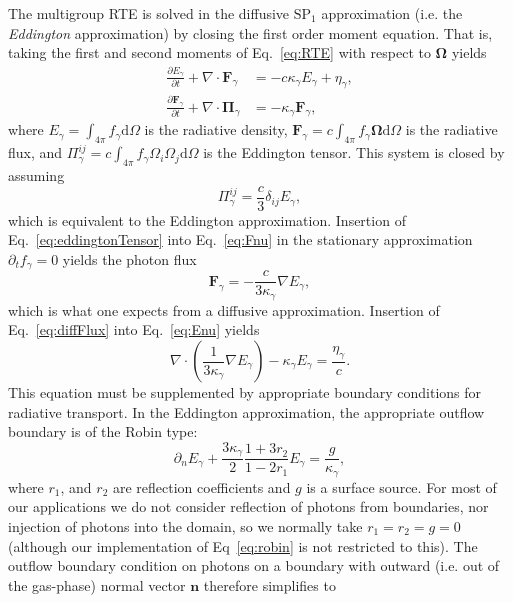 \documentclass[3p]{elsarticle}
\def\diff{\ensuremath{\text{d}}}
\begin{document}
The multigroup RTE is solved in the diffusive $\text{SP}_1$ approximation (i.e. the \emph{Eddington} approximation) by closing the first order moment equation. That is, taking the first and second moments of Eq.~\eqref{eq:RTE} with respect to $\bm{\Omega}$ yields
\begin{subequations}
  \begin{align}
    \label{eq:Enu}
    \frac{\partial E_\gamma}{\partial t} + \nabla\cdot\bm{F}_\gamma &= -c\kappa_\gamma E_\gamma + \eta_\gamma, \\
    \label{eq:Fnu}
    \frac{\partial \bm{F}_\gamma}{\partial t} + \nabla\cdot\bm{\Pi}_\gamma &= -\kappa_\gamma \bm{F}_\gamma,
  \end{align}
\end{subequations}
where $E_\gamma = \int_{4\pi}f_\gamma \diff\Omega$ is the radiative density, $\bm{F}_\gamma = c\int_{4\pi}f_\gamma\bm{\Omega} \diff\Omega$ is the radiative flux, and $\Pi_\gamma^{ij} = c\int_{4\pi}f_\gamma\Omega_i\Omega_j \diff\Omega$ is the Eddington tensor. This system is closed by assuming
\begin{equation}
  \label{eq:eddingtonTensor}
  \Pi_\gamma^{ij} = \frac{c}{3}\delta_{ij}E_\gamma,
\end{equation}
which is equivalent to the Eddington approximation. Insertion of Eq.~\eqref{eq:eddingtonTensor} into Eq.~\eqref{eq:Fnu} in the stationary approximation $\partial_tf_\gamma = 0$ yields the photon flux
\begin{equation}
  \label{eq:diffFlux}
  \bm{F}_\gamma = -\frac{c}{3\kappa_\gamma}\nabla E_\gamma,
\end{equation}
which is what one expects from a diffusive approximation. Insertion of Eq.~\eqref{eq:diffFlux} into Eq.~\eqref{eq:Enu} yields
\begin{equation}
  \label{eq:sp1}
  \nabla\cdot\left(\frac{1}{3\kappa_\gamma}\nabla E_\gamma\right) - \kappa_\gamma E_\gamma = \frac{\eta_\gamma}{c}. 
\end{equation}
This equation must be supplemented by appropriate boundary conditions for radiative transport. In the Eddington approximation, the appropriate outflow boundary is of the Robin type:
\begin{equation}
  \label{eq:robin}
  \partial_nE_\gamma + \frac{3\kappa_\gamma}{2}\frac{1 + 3r_2}{1 - 2r_1}E_\gamma = \frac{g}{\kappa_\gamma},
\end{equation}
where $r_1$, and $r_2$ are reflection coefficients and $g$ is a surface source. For most of our applications we do not consider reflection of photons from boundaries, nor injection of photons into the domain, so we normally take $r_1 = r_2 = g = 0$ (although our implementation of Eq~\eqref{eq:robin} is not restricted to this). The outflow boundary condition on photons on a boundary with outward (i.e. out of the gas-phase) normal vector $\bm{n}$ therefore simplifies to
\end{document}

